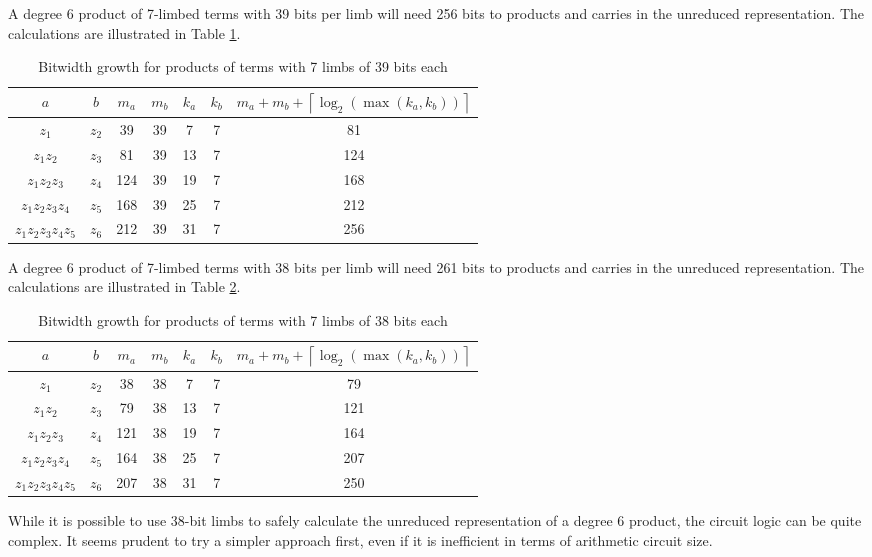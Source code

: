 \documentclass[a4paper, 12pt]{article}
\begin{document}
A degree 6 product of 7-limbed terms with 39 bits per limb will need 256 bits to products and carries in the unreduced representation. The calculations are illustrated in Table \ref{tab:limb39}.
\begin{table}[h]
  \centering
  \begin{tabular}{c|c|c|c|c|c|c}
    $a$ & $b$ & $m_a$ & $m_b$ & $k_a$ & $k_b$ & $m_a+m_b+\left\lceil \log_2 \left( \max\left( k_a, k_b \right) \right) \right\rceil$ \\ \hline
    $z_1$ & $z_2$ & 39 & 39 & 7 & 7 & 81 \\ \hline
    $z_1z_2$ & $z_3$ & 81 & 39 & 13 & 7 & 124 \\ \hline
    $z_1z_2z_3$ & $z_4$ & 124 & 39 & 19 & 7 & 168 \\ \hline
    $z_1z_2z_3z_4$ & $z_5$ & 168 & 39 & 25 & 7 & 212 \\ \hline
    $z_1z_2z_3z_4z_5$ & $z_6$ & 212 & 39 & 31 & 7 & 256 \\ \hline
  \end{tabular}
  \caption{Bitwidth growth for products of terms with 7 limbs of 39 bits each}
  \label{tab:limb39}
\end{table}

A degree 6 product of 7-limbed terms with 38 bits per limb will need 261 bits to products and carries in the unreduced representation. The calculations are illustrated in Table \ref{tab:limb38}.
\begin{table}[h]
  \centering
  \begin{tabular}{c|c|c|c|c|c|c}
    $a$ & $b$ & $m_a$ & $m_b$ & $k_a$ & $k_b$ & $m_a+m_b+\left\lceil \log_2 \left( \max\left( k_a, k_b \right) \right) \right\rceil$ \\ \hline
    $z_1$ & $z_2$ & 38 & 38 & 7 & 7 & 79 \\ \hline
    $z_1z_2$ & $z_3$ & 79 & 38 & 13 & 7 & 121 \\ \hline
    $z_1z_2z_3$ & $z_4$ & 121 & 38 & 19 & 7 & 164 \\ \hline
    $z_1z_2z_3z_4$ & $z_5$ & 164 & 38 & 25 & 7 & 207 \\ \hline
    $z_1z_2z_3z_4z_5$ & $z_6$ & 207 & 38 & 31 & 7 & 250 \\ \hline
  \end{tabular}
  \caption{Bitwidth growth for products of terms with 7 limbs of 38 bits each}
  \label{tab:limb38}
\end{table}

While it is possible to use 38-bit limbs to safely calculate the unreduced representation of a degree 6 product, the circuit logic can be quite complex. It seems prudent to try a simpler approach first, even if it is inefficient in terms of arithmetic circuit size.
\end{document}
